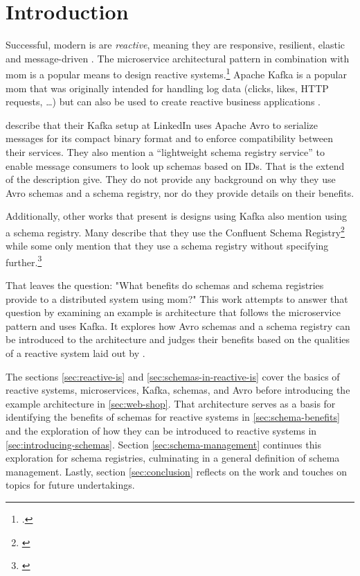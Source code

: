 
\section{Introduction}\label{sec:introduction}

Successful, modern \gls{is} are \emph{reactive}, meaning they are responsive, resilient, elastic and message-driven \parencite{boner_reactive_2014}.
The microservice architectural pattern in combination with \gls{mom} is a popular means to design reactive systems.\footnote{\cites()(85){loukides_microservice_adoption_2020}{fowler_microservices_2014}{boner_reactive_2014}{richardson_microservices_2019}.}
Apache Kafka is a popular \gls{mom} that was originally intended for handling log data (clicks, likes, HTTP requests, \ldots) \parencite{kreps_kafka_2011} but can also be used to create reactive business applications \parencite{stopford_designing_2018}.

\citeauthor[]{kreps_kafka_2011} describe that their Kafka setup at LinkedIn uses Apache Avro to serialize messages for its compact binary format and to enforce compatibility between their services.
They also mention a \enquote{lightweight schema registry service} to enable message consumers to look up schemas based on IDs.
That is the extend of the description \citeauthor[]{kreps_kafka_2011} give.
They do not provide any background on why they use Avro schemas and a schema registry, nor do they provide details on their benefits.
\parencite{kreps_kafka_2011}

Additionally, other works that present \gls{is} designs using Kafka also mention using a schema registry.
Many describe that they use the Confluent Schema Registry\footnote{\cites{radchenko_micro-workflows_2018}{ranjan_radar-base_2019}{korhonen_using_2019}{auer_distributed_2017}{dessalegn_muruts_multi-tenant_2016}}
while some only mention that they use a schema registry without specifying further.\footnote{\cites{g_b_high_2021}{muller_iot_2017}}

That leaves the question: "What benefits do schemas and schema registries provide to a distributed system using \gls{mom}?"
This work attempts to answer that question by examining an example \gls{is} architecture that follows the microservice pattern and uses Kafka.
It explores how Avro schemas and a schema registry can be introduced to the architecture and judges their benefits based on the qualities of a reactive system laid out by \cite{boner_reactive_2014}.

The sections \ref{sec:reactive-is} and \ref{sec:schemas-in-reactive-is} cover the basics of reactive systems, microservices, Kafka, schemas, and Avro before introducing the example architecture in \ref{sec:web-shop}.
That architecture serves as a basis for identifying the benefits of schemas for reactive systems in \ref{sec:schema-benefits} and the exploration of how they can be introduced to reactive systems in \ref{sec:introducing-schemas}.
Section \ref{sec:schema-management} continues this exploration for schema registries, culminating in a general definition of schema management.
Lastly, section \ref{sec:conclusion} reflects on the work and touches on topics for future undertakings.